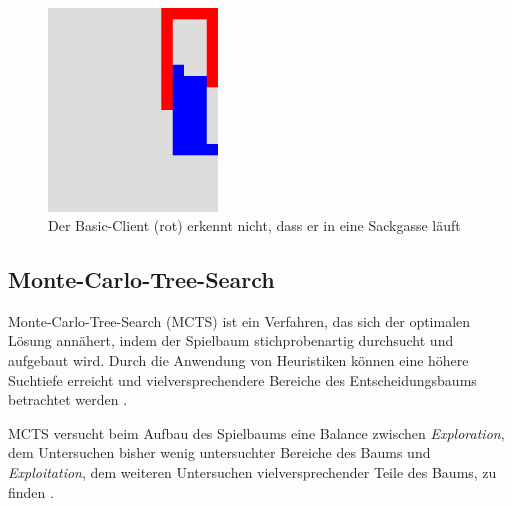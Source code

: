 \documentclass[12pt,a4paper]{article}
\begin{document}
\begin{figure}[h]
    \centering
    \includegraphics[width=0.4\textwidth]{smart.jpg}
    \caption{Der Basic-Client (rot) erkennt nicht, dass er in eine Sackgasse läuft}
    \label{fig:smart-dead}
\end{figure}

\subsection{Monte-Carlo-Tree-Search}
Monte-Carlo-Tree-Search (MCTS) ist ein Verfahren, das sich der optimalen Lösung an\-nähert, indem der Spielbaum stichprobenartig durchsucht und aufgebaut wird. Durch die Anwendung von Heuristiken können eine höhere Suchtiefe erreicht und vielversprechendere Bereiche des Entscheidungsbaums betrachtet werden \cite{browne2012}.

MCTS versucht beim Aufbau des Spielbaums eine Balance zwischen \textit{Exploration}, dem Untersuchen bisher wenig untersuchter Bereiche des Baums und \textit{Exploitation}, dem weiteren Untersuchen vielversprechender Teile des Baums, zu finden \cite{browne2012}. 
\end{document}
